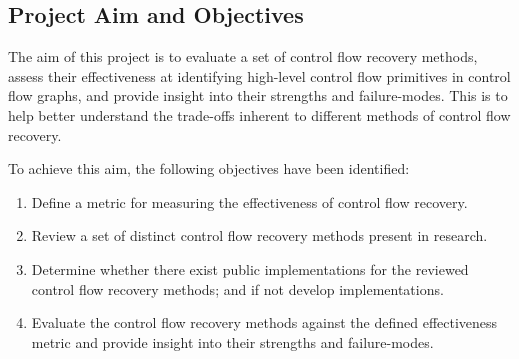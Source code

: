 
\subsection{Project Aim and Objectives}

The aim of this project is to evaluate a set of control flow recovery methods, assess their effectiveness at identifying high-level control flow primitives in control flow graphs, and provide insight into their strengths and failure-modes. This is to help better understand the trade-offs inherent to different methods of control flow recovery.

To achieve this aim, the following objectives have been identified:

\begin{enumerate}
	\item \label{itm:obj_define_effectiveness_metric} Define a metric for measuring the effectiveness of control flow recovery.
	\item \label{itm:obj_review_cfa_methods} Review a set of distinct control flow recovery methods present in research.
	\item \label{itm:obj_cfa_components} Determine whether there exist public implementations for the reviewed control flow recovery methods; and if not develop implementations.
	\item \label{itm:obj_cfa_evaluation} Evaluate the control flow recovery methods against the defined effectiveness metric and provide insight into their strengths and failure-modes.
\end{enumerate}
